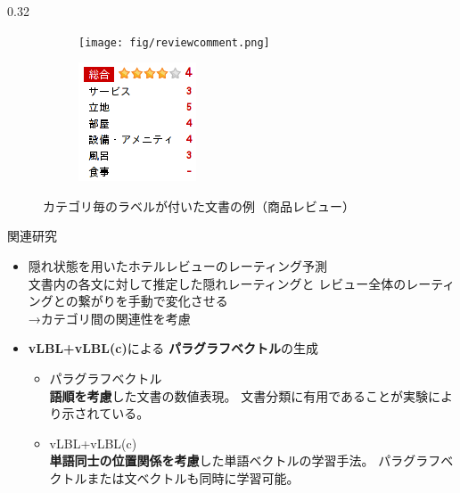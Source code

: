 \documentclass[8pt,unicode]{beamer}
\newcommand{\columnscale}{0.32}
\newcommand{\arrow}{{\color{ttiblue} →}\hspace{1ex}}
\newcommand{\good}[1]{\textbf{\color{orange} #1}}
\newcommand{\keyword}[1]{\textbf{\color{red} #1}}
\begin{document}
\begin{frame}{}
\begin{columns}[t]
\begin{column}{\columnscale\textwidth}
  \begin{figure}
    \begin{subfigure}{0.52\textwidth}
      \texttt{[image: fig/reviewcomment.png]}
    \end{subfigure}
    \begin{subfigure}{0.32\textwidth}
      \includegraphics[width=\textwidth]{fig/reviewpoints.png}
    \end{subfigure}
    \caption{カテゴリ毎のラベルが付いた文書の例（商品レビュー）}
  \end{figure}

  \begin{block}{関連研究}
    \begin{itemize}
      \item 隠れ状態を用いたホテルレビューのレーティング予測 \\
        文書内の各文に対して推定した隠れレーティングと
        レビュー全体のレーティングとの繋がりを手動で変化させる \\
        \arrow カテゴリ間の関連性を考慮
      \item \keyword{vLBL+vLBL(c)}による\keyword{パラグラフベクトル}の生成 \\
        \begin{itemize}
          \item {\normalsize パラグラフベクトル} \\
            \good{語順を考慮}した文書の数値表現。
            文書分類に有用であることが実験により示されている。
          \item {\normalsize vLBL+vLBL(c)} \\
            \good{単語同士の位置関係を考慮}した単語ベクトルの学習手法。
            パラグラフベクトルまたは文ベクトルも同時に学習可能。
        \end{itemize}
    \end{itemize}
  \end{block}


\end{column}
\end{columns}
\end{frame}
\end{document}
